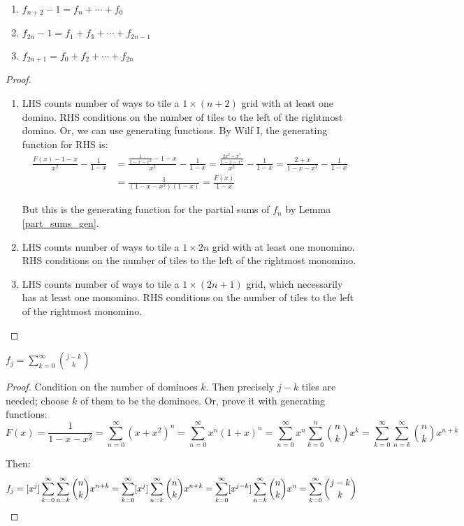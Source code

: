 \documentclass[a4paper]{article}
\begin{document}
\begin{lemma}
\;
\begin{enumerate}
\item $f_{n+2}-1=f_n+\cdots+f_0$
\item $f_{2n}-1=f_1+f_3+\cdots+f_{2n-1}$
\item $f_{2n+1}=f_{0}+f_2+\cdots+f_{2n}$
\end{enumerate}

\begin{hl}
\begin{proof}
\;
\begin{enumerate}
\item LHS counts number of ways to tile a $1\times(n+2)$ grid with at least one domino. RHS conditions on the number of tiles to the left of the rightmost domino. Or, we can use generating functions. By Wilf I, the generating function for RHS is:
\begin{align*}
\frac{F(x)-1-x}{x^2}-\frac1{1-x}
&=\frac{\frac1{1-x-x^2}-1-x}{x^2}-\frac1{1-x}
=\frac{\frac{2x^2+x^3}{1-x-x^2}}{x^2}-\frac1{1-x}
=\frac{2+x}{1-x-x^2}-\frac1{1-x}\\
&=\frac{1}{(1-x-x^2)(1-x)}
=\frac{F(x)}{1-x}
\end{align*}

But this is the generating function for the partial sums of $f_n$ by Lemma \ref{part_sums_gen}.
\item LHS counts number of ways to tile a $1\times 2n$ grid with at least one monomino. RHS conditions on the number of tiles to the left of the rightmost monomino.
\item LHS counts number of ways to tile a $1\times (2n+1)$ grid, which necessarily has at least one monomino. RHS conditions on the number of tiles to the left of the rightmost monomino.\qedhere
\end{enumerate}
\end{proof}
\end{hl}
\end{lemma}

\begin{lemma}
$f_j=\sum_{k=0}^\infty\binom{j-k}k$

\begin{hl}
\begin{proof}
Condition on the number of dominoes $k$. Then precisely $j-k$ tiles are needed; choose $k$ of them to be the dominoes. Or, prove it with generating functions:
\begin{equation*}
F(x)
=\frac1{1-x-x^2}
=\sum_{n=0}^\infty(x+x^2)^n
=\sum_{n=0}^\infty x^n(1+x)^n
=\sum_{n=0}^\infty x^n\sum_{k=0}^n\binom nkx^k
=\sum_{k=0}^\infty\sum_{n=k}^\infty\binom nkx^{n+k}
\end{equation*}

Then:
\begin{equation*}
f_j
=[x^j]\sum_{k=0}^\infty\sum_{n=k}^\infty\binom nkx^{n+k}
=\sum_{k=0}^\infty[x^j]\sum_{n=k}^\infty\binom nkx^{n+k}
=\sum_{k=0}^\infty[x^{j-k}]\sum_{n=k}^\infty\binom nkx^n
=\sum_{k=0}^\infty\binom{j-k}k\qedhere
\end{equation*}
\end{proof}
\end{hl}
\end{lemma}
\end{document}
